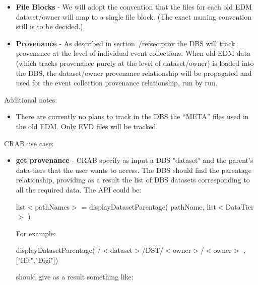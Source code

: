 \documentclass[pdftex]{cmspaper}
\begin{document}
{\begin{itemize}
\begin{center}
   /$<$Dataset$>$/$<$DataTier$>$/$<$Owner$>$/EvC\_Run$<$run-number$>$ 
\end{center}

and these will be the event collection names entered into the DBS. Jobs
will be configured with one or more such event collections. (Note that
this doesn't imply that the same naming convention for event collections
will be used for event collections in the new Framework/EDM. This is just
what works currently with ORCA and the old EDM.)

\item {\bf File Blocks} - We will adopt the convention that the files for each 
                    old 
                    EDM dataset/owner will map to a single file block. (The
                    exact naming convention still is to be decided.)
\item {\bf Provenance} - As described in section~/ref{sec:prov} the DBS
                    will track provenance at the level of individual event
                    collections. When old EDM data (which tracks provenance
                    purely at the level of dataset/owner) is loaded into
                    the DBS, the dataset/owner provenance relationship will
                    be propagated and used for the event collection provenance
                    relationship, run by run.
\end{itemize}

  Additional notes:

\begin{itemize}
\item There are currently no plans to track in the DBS the ``META'' files 
used in the old EDM. Only EVD files will be tracked. 
\end{itemize}

  CRAB use case:
\begin{itemize}
\item {\bf get provenance } - CRAB specify as input a DBS "dataset" and the parent's data-tiers that the user wants to access. The DBS should find the parentage relationship, providing as a result the list of DBS datasets corresponding to all the required data.
The API could be:
\begin{center}
   list$<$pathNames$>$  = displayDatasetParentage( pathName, list$<$DataTier$>$ ) 
\end{center}

For example:
\begin{center}
   displayDatasetParentage( /$<$dataset$>$/DST/$<$owner$>$/$<$owner$>$ , ["Hit","Digi"])
\end{center}
should give as a result something like:


\end{itemize}}
\end{document}
